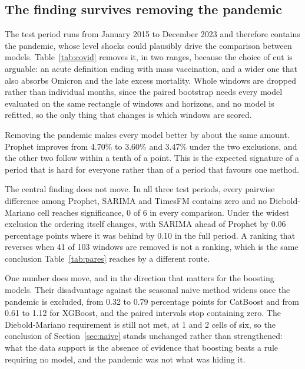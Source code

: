 \subsection{The finding survives removing the pandemic}



The test period runs from January 2015 to December 2023 and therefore contains the pandemic,
whose level shocks could plausibly drive the comparison between models. Table~\ref{tab:covid}
removes it, in two ranges, because the choice of cut is arguable: an acute definition ending
with mass vaccination, and a wider one that also absorbs Omicron and the late excess
mortality. Whole windows are dropped rather than individual months, since the paired
bootstrap needs every model evaluated on the same rectangle of windows and horizons, and no
model is refitted, so the only thing that changes is which windows are scored.

Removing the pandemic makes every model better by about the same amount. Prophet improves
from 4.70\% to 3.60\% and 3.47\% under the two exclusions, and the other
two follow within a tenth of a point. This is the expected signature of a period that is
hard for everyone rather than of a period that favours one method.

The central finding does not move. In all three test periods, every pairwise difference among
Prophet, SARIMA and TimesFM contains zero and no Diebold-Mariano cell reaches significance,
0 of 6 in every comparison. Under the widest exclusion the ordering itself changes, with
SARIMA ahead of Prophet by 0.06 percentage points where it was behind by 0.10 in the full
period. A ranking that reverses when 41 of 103 windows are removed is not a ranking, which is
the same conclusion Table~\ref{tab:pares} reaches by a different route.

One number does move, and in the direction that matters for the boosting models. Their
disadvantage against the seasonal naive method widens once the pandemic is excluded, from
0.32 to 0.79 percentage points for CatBoost and from 0.61 to 1.12 for XGBoost, and
the paired intervals stop containing zero. The Diebold-Mariano requirement is still not met,
at 1 and 2 cells of six, so the conclusion of Section~\ref{sec:naive} stands unchanged rather
than strengthened: what the data support is the absence of evidence that boosting beats a
rule requiring no model, and the pandemic was not what was hiding it.



